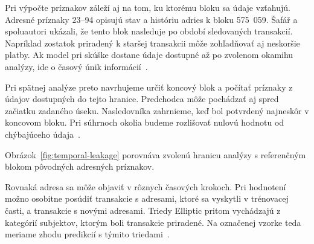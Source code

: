 Pri výpočte príznakov záleží aj na tom, ku ktorému bloku sa
údaje vzťahujú. Adresné príznaky 23--94 opisujú stav a históriu
adries k bloku 575~059. Šafář a spoluautori ukázali, že tento blok nasleduje po
období sledovaných transakcií. Napríklad zostatok priradený k staršej
transakcii môže zohľadňovať aj neskoršie platby. Ak model pri skúške
dostane údaje dostupné až po zvolenom okamihu analýzy, ide o časový
únik informácií~\cite{safar2026elliptic}.

Pri spätnej analýze preto navrhujeme určiť koncový blok a počítať
príznaky z údajov dostupných do tejto hranice. Predchodca môže
pochádzať aj spred začiatku zadaného úseku. Nasledovníka zahrnieme,
keď bol potvrdený najneskôr v koncovom bloku. Pri súhrnoch okolia
budeme rozlišovať nulovú hodnotu od chýbajúceho údaja~\cite{safar2026elliptic}.

Obrázok~\ref{fig:temporal-leakage} porovnáva zvolenú hranicu
analýzy s referenčným blokom pôvodných adresných príznakov.

\begin{center}
  \begin{minipage}{\textwidth}
  \captionsetup{type=figure}
  \centering
  \caption{Koncový blok analýzy a referenčný blok pôvodných príznakov.}
  \label{fig:temporal-leakage}
  \end{minipage}
\end{center}

Rovnaká adresa sa môže objaviť v rôznych časových krokoch. Pri
hodnotení možno osobitne posúdiť transakcie s adresami, ktoré sa
vyskytli v trénovacej časti, a transakcie s novými adresami. Triedy
Elliptic pritom vychádzajú z kategórií subjektov, ktorým boli
transakcie priradené. Na označenej vzorke teda meriame zhodu
predikcií s týmito triedami~\cite{weber2019elliptic,safar2026elliptic}.

